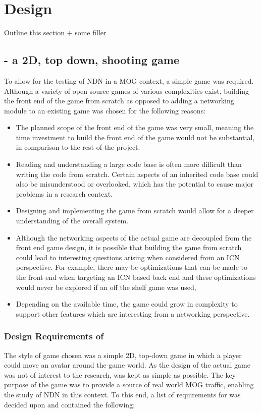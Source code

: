 \chapter{Design}
Outline this section + some filler 


\section{\game{} - a 2D, top down, shooting game}
To allow for the testing of NDN in a MOG context, a simple game was required. Although a variety of open source games of various complexities exist, building the front end of the game from scratch as opposed to adding a networking module to an existing game was chosen for the following reasons:

\begin{itemize}
    \item The planned scope of the front end of the game was very small, meaning the time investment to build the front end of the game would not be substantial, in comparison to the rest of the project.
    \item Reading and understanding a large code base is often more difficult than writing the code from scratch. Certain aspects of an inherited code base could also be misunderstood or overlooked, which has the potential to cause major problems in a research context. 
    \item Designing and implementing the game from scratch would allow for a deeper understanding of the overall system.
    \item Although the networking aspects of the actual game are decoupled from the front end game design, it is possible that building the game from scratch could lead to interesting questions arising when considered from an ICN perspective. For example, there may be optimizations that can be made to the front end when targeting an ICN based back end and these optimizations would never be explored if an off the shelf game was used,
    \item Depending on the available time, the game could grow in complexity to support other features which are interesting from a networking perspective.
\end{itemize}

\subsection{Design Requirements of \game{}}
The style of game chosen was a simple 2D, top-down game in which a player could move an avatar around the game world. As the design of the actual game was not of interest to the research, \game{} was kept as simple as possible. The key purpose of the game was to provide a source of real world MOG traffic, enabling the study of NDN in this context. To this end, a list of requirements for \game{} was decided upon and contained the following:

